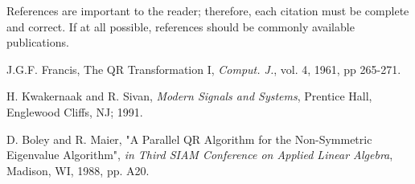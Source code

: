 \documentclass[a4paper, 10pt, conference]{ieeeconf}      %
\begin{document}

References are important to the reader; therefore, each citation must be complete and correct. If at all possible, references should be commonly available publications.

\begin{thebibliography}{99}

J.G.F. Francis, The QR Transformation I, {\it Comput. J.}, vol. 4, 1961, pp 265-271.

H. Kwakernaak and R. Sivan, {\it Modern Signals and Systems}, Prentice Hall, Englewood Cliffs, NJ; 1991.

D. Boley and R. Maier, "A Parallel QR Algorithm for the Non-Symmetric Eigenvalue Algorithm", {\it in Third SIAM Conference on Applied Linear Algebra}, Madison, WI, 1988, pp. A20.

\end{thebibliography}
\end{document}
